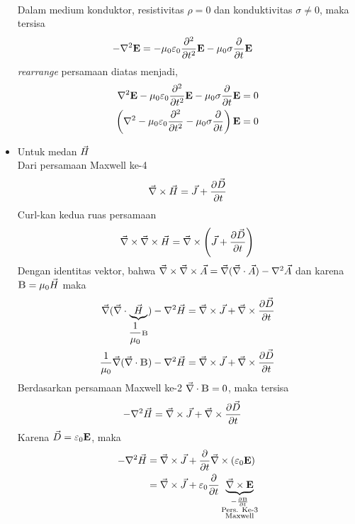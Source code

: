 \begin{itemize}[leftmargin=*]
\begin{align*}
        \end{align*}
        Dalam medium konduktor, resistivitas $\rho=0$ dan konduktivitas $\sigma\neq 0$, maka tersisa
        \begin{align*}
            -\nabla^2\vE&=-\mu_0\epsilon_0 \frac{\partial^2 }{\partial t^2}\vE-\mu_0\sigma \frac{\partial }{\partial t}\vE
        \end{align*}
        \textit{rearrange} persamaan diatas menjadi,
        \begin{align*}
            \nabla^2\vE-\mu_0\epsilon_0 \frac{\partial^2 }{\partial t^2}\vE-\mu_0\sigma \frac{\partial }{\partial t}\vE&=0\\
            \left(\nabla^2-\mu_0\epsilon_0 \frac{\partial^2 }{\partial t^2}-\mu_0\sigma \frac{\partial }{\partial t}\right)\vE&=0
        \end{align*}
    \item Untuk medan $\vec{H}$\\
    Dari persamaan Maxwell ke-4
    \begin{align*}
        \vec{\nabla} \times \vec{H} = \vec{J}+\frac{\partial \vec{D}}{\partial t}
    \end{align*}
    Curl-kan kedua ruas persamaan
    \begin{align*}
        \vec{\nabla} \times\vec{\nabla} \times \vec{H} = \vec{\nabla} \times\left(\vec{J}+\frac{\partial \vec{D}}{\partial t}\right)
    \end{align*}
    Dengan identitas vektor, bahwa $\vec{\nabla} \times \vec{\nabla} \times \vec{A}=\vec{\nabla}(\vec{\nabla}\cdot\vec{A})-\nabla^2 \vec{A}$ dan karena $\vB = \mu_0 \vH$ maka
    \begin{align*}
        \vnabla(\vnabla\cdot\underbrace{\vH}_{\dfrac{1}{\mu_0}\vB})-\nabla^2\vH &= \vnabla \times \vJ+\vnabla \times\frac{\partial \vD}{\partial t}\\
        \frac{1}{\mu_0}\vnabla(\vnabla\cdot\vB)-\nabla^2\vH &= \vnabla \times \vJ+\vnabla \times\frac{\partial \vD}{\partial t}
    \end{align*}
    Berdasarkan persamaan Maxwell ke-2 $\vnabla \cdot \vB=0$, maka tersisa
    \begin{align*}
        -\nabla^2\vec{H} &= \vec{\nabla} \times \vec{J}+\vec{\nabla} \times\frac{\partial \vec{D}}{\partial t}
    \end{align*}
    Karena $\vD=\epsilon_0 \vE$, maka
    \begin{align*}
        -\nabla^2\vH &= \vnabla \times \vJ + \frac{\partial}{\partial t}\vnabla \times (\epsilon_0 \vE)\\
        &=\vnabla \times \vJ + \epsilon_0\frac{\partial}{\partial t}\underbrace{\vnabla \times \vE}_{\substack{-\frac{\partial \vB}{\partial t} \\ \text{Pers. Ke-3} \\\text{Maxwell}}}\\

\end{align*}
\end{itemize}
